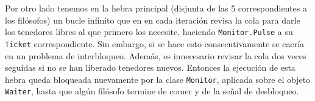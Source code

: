 \documentclass[12pt]{amsart}
\theoremstyle{definition}
\numberwithin{equation}{section}
\newcommand{\csl}[1]{\texttt{#1}}
\begin{document}
 Por otro lado tenemos en la hebra principal (disjunta de las 5 correspondientes a los fil\'osofos) un bucle infinito que en en cada iteraci\'on revisa la cola para darle los tenedores libres al que primero los necesite, haciendo \csl{Monitor.Pulse} a su \csl{Ticket} correspondiente. Sin embargo, si se hace esto consecutivamente se caer\'ia en un problema de interbloqueo. Adem\'as, es innecesario revisar la cola dos veces seguidas si no se han liberado tenedores nuevos. Entonces la ejecuci\'on de esta hebra queda bloqueada nuevamente por la clase \csl{Monitor}, aplicada sobre el objeto \csl{Waiter}, hasta que alg\'un fil\'osofo termine de comer y de la se\~nal de desbloqueo.
 
 
\end{document}
